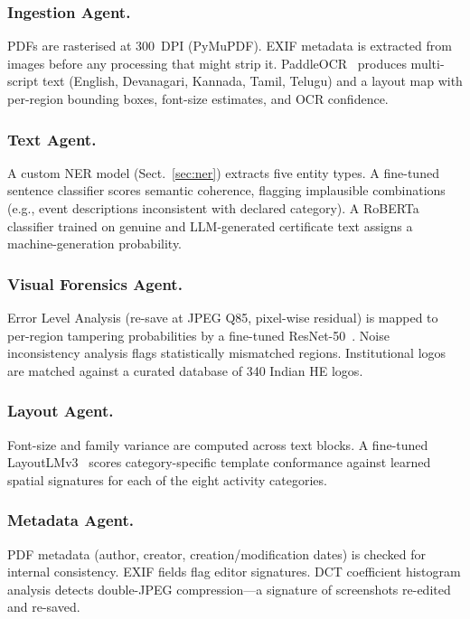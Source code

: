 \documentclass[runningheads]{llncs}
\begin{document}
\subsubsection{Ingestion Agent.} PDFs are rasterised at 300~DPI (PyMuPDF). EXIF metadata is extracted from images before any processing that might strip it. PaddleOCR~\cite{du2020} produces multi-script text (English, Devanagari, Kannada, Tamil, Telugu) and a layout map with per-region bounding boxes, font-size estimates, and OCR confidence.

\subsubsection{Text Agent.} A custom NER model (Sect.~\ref{sec:ner}) extracts five entity types. A fine-tuned sentence classifier scores semantic coherence, flagging implausible combinations (e.g., event descriptions inconsistent with declared category). A RoBERTa classifier trained on genuine and LLM-generated certificate text assigns a machine-generation probability.

\subsubsection{Visual Forensics Agent.} Error Level Analysis (re-save at JPEG Q85, pixel-wise residual) is mapped to per-region tampering probabilities by a fine-tuned ResNet-50~\cite{he2016}. Noise inconsistency analysis flags statistically mismatched regions. Institutional logos are matched against a curated database of 340 Indian HE logos.

\subsubsection{Layout Agent.} Font-size and family variance are computed across text blocks. A fine-tuned LayoutLMv3~\cite{xu2022} scores category-specific template conformance against learned spatial signatures for each of the eight activity categories.

\subsubsection{Metadata Agent.} PDF metadata (author, creator, creation/modification dates) is checked for internal consistency. EXIF fields flag editor signatures. DCT coefficient histogram analysis detects double-JPEG compression---a signature of screenshots re-edited and re-saved.
\end{document}
